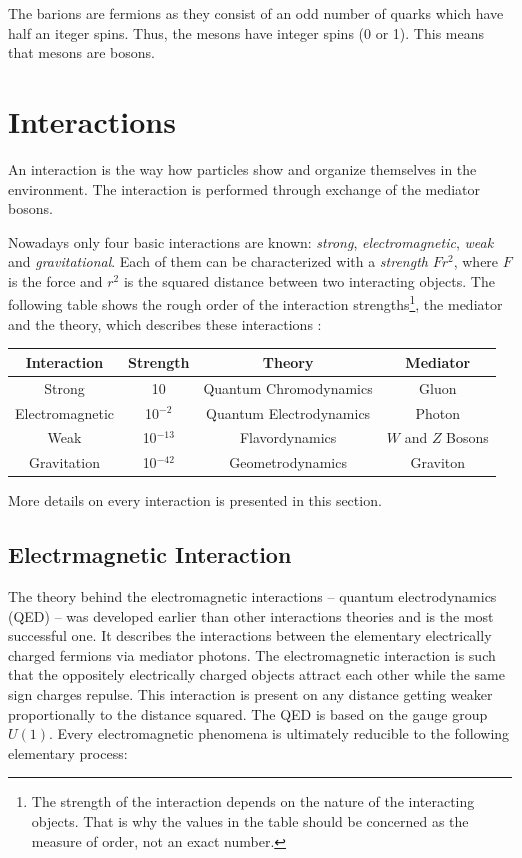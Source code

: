 The barions are fermions as they consist of an odd number of quarks which have half an iteger spins. Thus, the mesons have integer spins
(0 or 1). This means that mesons are bosons.

\section{Interactions}

An interaction is the way how particles show and organize themselves in the environment. The interaction is performed through exchange
of the mediator bosons.

Nowadays only four basic interactions are known: \textit{strong}, \textit{electromagnetic}, \textit{weak} and \textit{gravitational}. 
Each of them can be characterized with a \textit{strength} $Fr^2$, where $F$ is the force and $r^2$ is the squared distance between two interacting objects.
The following table shows the rough order of the interaction strengths\footnote{The strength of the interaction depends on the nature of the 
interacting objects. That is why the values in the table should be concerned as the measure of order, not an exact number.}, the mediator
and the theory, which describes these interactions \cite{griffiths2008introduction}:

\begin{center}\label{tab:forces}
  \begin{tabular}{ | c | c | c | c | }
    \hline
    \textbf{Interaction} & \textbf{Strength} & \textbf{Theory} & \textbf{Mediator} \\ \hline \hline
    Strong & 10 & Quantum Chromodynamics & Gluon \\ \hline 
    Electromagnetic & 10$^{-2}$ & Quantum Electrodynamics & Photon \\ \hline
    Weak & 10$^{-13}$ & Flavordynamics & $W$ and $Z$ Bosons \\ \hline
    Gravitation & 10$^{-42}$ & Geometrodynamics & Graviton \\
    \hline
  \end{tabular}
\end{center}

More details on every interaction is presented in this section.

\subsection{Electrmagnetic Interaction}

The theory behind the electromagnetic interactions -- quantum electrodynamics (QED) -- was developed earlier than other interactions theories
and is the most successful one. It describes the interactions between the elementary electrically charged fermions via mediator photons.
The electromagnetic interaction is such that the oppositely electrically charged objects attract each other while the same sign charges repulse.
This interaction is present on any distance getting weaker proportionally to the distance squared. The QED is based on the gauge group $U(1)$.
Every electromagnetic phenomena is ultimately reducible to the following elementary process:

